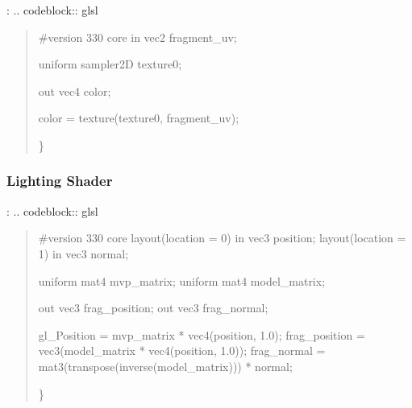 \documentclass[a4paper,10pt,english,openany,oneside]{sphinxmanual}
\begin{document}
\sphinxAtStartPar
{}:
.. code\sphinxhyphen{}block:: glsl
\begin{quote}

\sphinxAtStartPar
\#version 330 core
in vec2 fragment\_uv;

\sphinxAtStartPar
uniform sampler2D texture0;

\sphinxAtStartPar
out vec4 color;
\begin{description}
\sphinxAtStartPar
color = texture(texture0, fragment\_uv);

\end{description}

\sphinxAtStartPar
\}
\end{quote}


\subsubsection{Lighting Shader}
\label{\detokenize{api/shaders:lighting-shader}}
\sphinxAtStartPar
{}:
.. code\sphinxhyphen{}block:: glsl
\begin{quote}

\sphinxAtStartPar
\#version 330 core
layout(location = 0) in vec3 position;
layout(location = 1) in vec3 normal;

\sphinxAtStartPar
uniform mat4 mvp\_matrix;
uniform mat4 model\_matrix;

\sphinxAtStartPar
out vec3 frag\_position;
out vec3 frag\_normal;
\begin{description}
\sphinxAtStartPar
gl\_Position = mvp\_matrix * vec4(position, 1.0);
frag\_position = vec3(model\_matrix * vec4(position, 1.0));
frag\_normal = mat3(transpose(inverse(model\_matrix))) * normal;

\end{description}

\sphinxAtStartPar
\}
\end{quote}
\end{document}
